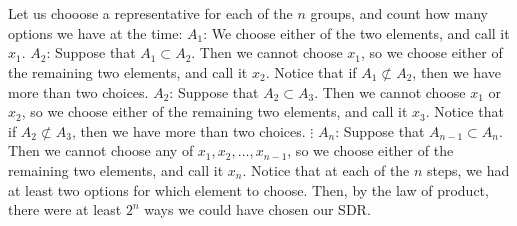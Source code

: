 \documentclass{article}
\begin{document}
\section{} %
Let us chooose a representative for each of the $n$ groups, and count how many
options we have at the time:
\newline
\newline
$A_1$: We choose either of the two elements, and call it $x_1$.
\newline
$A_2$: Suppose that $A_1\subset A_2$. Then we cannot choose $x_1$, so we
choose either of the remaining two elements, and call it $x_2$. Notice that if
$A_1\not\subset A_2$, then we have more than two choices.
\newline
$A_2$: Suppose that $A_2\subset A_3$. Then we cannot choose $x_1$ or $x_2$, so we
choose either of the remaining two elements, and call it $x_3$. Notice that if
$A_2\not\subset A_3$, then we have more than two choices.
\newline
$\vdots$
\newline
$A_n$: Suppose that $A_{n-1}\subset A_n$. Then we cannot choose any of
$x_1,x_2,\ldots,x_{n-1}$, so we choose either of the remaining two elements,
and call it $x_n$.
\newline
\newline
Notice that at each of the $n$ steps, we had at least two options for which
element to choose. Then, by the law of product, there were at least $2^n$ ways
we could have chosen our SDR.
\section{} %
\end{document}
